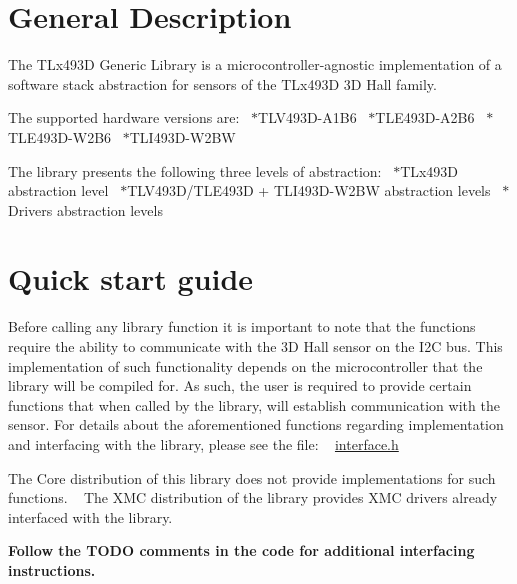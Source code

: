 \hypertarget{index_s1}{}\section{General Description}\label{index_s1}
The T\+Lx493D Generic Library is a microcontroller-\/agnostic implementation of a software stack abstraction for sensors of the T\+Lx493D 3D Hall family.

The supported hardware versions are\+:~\newline
 $\ast$\+T\+L\+V493\+D-\/\+A1\+B6~\newline
 $\ast$\+T\+L\+E493\+D-\/\+A2\+B6~\newline
 $\ast$\+T\+L\+E493\+D-\/\+W2\+B6~\newline
 $\ast$\+T\+L\+I493\+D-\/\+W2\+BW~\newline


The library presents the following three levels of abstraction\+:~\newline
 $\ast$\+T\+Lx493D abstraction level~\newline
 $\ast$\+T\+L\+V493\+D/\+T\+L\+E493D + T\+L\+I493\+D-\/\+W2\+BW abstraction levels~\newline
 $\ast$\+Drivers abstraction levels~\newline
\hypertarget{index_s2}{}\section{Quick start guide}\label{index_s2}
Before calling any library function it is important to note that the functions require the ability to communicate with the 3D Hall sensor on the I2C bus. This implementation of such functionality depends on the microcontroller that the library will be compiled for. As such, the user is required to provide certain functions that when called by the library, will establish communication with the sensor. For details about the aforementioned functions regarding implementation and interfacing with the library, please see the file\+: ~\newline
 \mbox{\hyperlink{interface_8h}{interface.\+h}}

The Core distribution of this library does not provide implementations for such functions. ~\newline
 The X\+MC distribution of the library provides X\+MC drivers already interfaced with the library.

{\bfseries Follow the T\+O\+DO comments in the code for additional interfacing instructions.}

